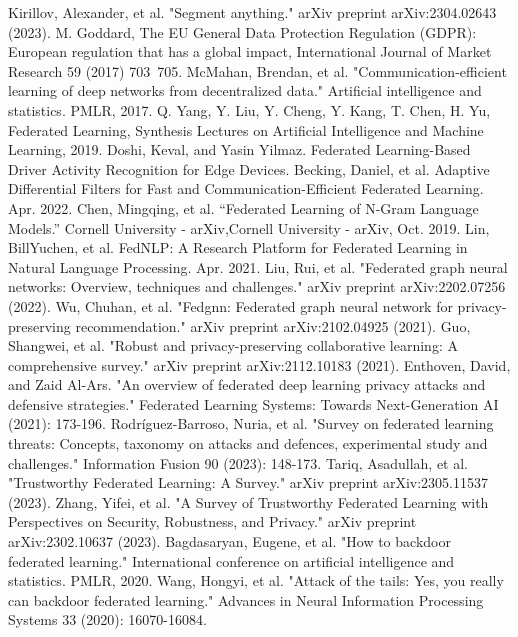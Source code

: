 \documentclass[conference]{IEEEtran}
\begin{document}
\begin{thebibliography}{00}
     Kirillov, Alexander, et al. "Segment anything." arXiv preprint arXiv:2304.02643 (2023).
     M. Goddard, The EU General Data Protection Regulation (GDPR): European regulation that has a global impact, International Journal of Market Research 59 (2017) 703~705.
     McMahan, Brendan, et al. "Communication-efficient learning of deep networks from decentralized data." Artificial intelligence and statistics. PMLR, 2017.
     Q. Yang, Y. Liu, Y. Cheng, Y. Kang, T. Chen, H. Yu, Federated Learning, Synthesis Lectures on Artificial Intelligence and Machine Learning, 2019.
     Doshi, Keval, and Yasin Yilmaz. Federated Learning-Based Driver Activity Recognition for Edge Devices.
     Becking, Daniel, et al. Adaptive Differential Filters for Fast and Communication-Efficient Federated Learning. Apr. 2022.
     Chen, Mingqing, et al. “Federated Learning of N-Gram Language Models.” Cornell University - arXiv,Cornell University - arXiv, Oct. 2019.  
     Lin, BillYuchen, et al. FedNLP: A Research Platform for Federated Learning in Natural Language Processing. Apr. 2021.  
     Liu, Rui, et al. "Federated graph neural networks: Overview, techniques and challenges." arXiv preprint arXiv:2202.07256 (2022).  
     Wu, Chuhan, et al. "Fedgnn: Federated graph neural network for privacy-preserving recommendation." arXiv preprint arXiv:2102.04925 (2021).  
     Guo, Shangwei, et al. "Robust and privacy-preserving collaborative learning: A comprehensive survey." arXiv preprint arXiv:2112.10183 (2021).
     Enthoven, David, and Zaid Al-Ars. "An overview of federated deep learning privacy attacks and defensive strategies." Federated Learning Systems: Towards Next-Generation AI (2021): 173-196.
     Rodríguez-Barroso, Nuria, et al. "Survey on federated learning threats: Concepts, taxonomy on attacks and defences, experimental study and challenges." Information Fusion 90 (2023): 148-173.
     Tariq, Asadullah, et al. "Trustworthy Federated Learning: A Survey." arXiv preprint arXiv:2305.11537 (2023).
     Zhang, Yifei, et al. "A Survey of Trustworthy Federated Learning with Perspectives on Security, Robustness, and Privacy." arXiv preprint arXiv:2302.10637 (2023).
     Bagdasaryan, Eugene, et al. "How to backdoor federated learning." International conference on artificial intelligence and statistics. PMLR, 2020.
     Wang, Hongyi, et al. "Attack of the tails: Yes, you really can backdoor federated learning." Advances in Neural Information Processing Systems 33 (2020): 16070-16084.

\end{thebibliography}
\end{document}
